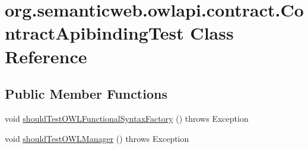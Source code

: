 \hypertarget{classorg_1_1semanticweb_1_1owlapi_1_1contract_1_1_contract_apibinding_test}{\section{org.\-semanticweb.\-owlapi.\-contract.\-Contract\-Apibinding\-Test Class Reference}
\label{classorg_1_1semanticweb_1_1owlapi_1_1contract_1_1_contract_apibinding_test}
}
\subsection*{Public Member Functions}
\begin{DoxyCompactItemize}
\item 
void \hyperlink{classorg_1_1semanticweb_1_1owlapi_1_1contract_1_1_contract_apibinding_test_ab39b975cb5a59b2abaa7da97fc0054b5}{should\-Test\-O\-W\-L\-Functional\-Syntax\-Factory} ()  throws Exception 
\item 
void \hyperlink{classorg_1_1semanticweb_1_1owlapi_1_1contract_1_1_contract_apibinding_test_a69c4b2cb39d466a207ec25a82fc0c364}{should\-Test\-O\-W\-L\-Manager} ()  throws Exception 
\end{DoxyCompactItemize}


